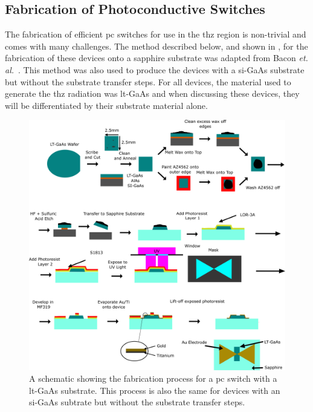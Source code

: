 \subsection{Fabrication of Photoconductive Switches}
The fabrication of efficient \acrshort{pc} switches for use in the \acrshort{thz} region is non\nobreakdash-trivial and comes with many challenges. The method described below, and shown in , for the fabrication of these devices onto a sapphire substrate was adapted from Bacon \textit{et. al.}~\cite{Bacon2016}. This method was also used to produce the devices with a \acrshort{si}\nobreakdash-GaAs substrate but without the substrate transfer steps. For all devices, the material used to generate the \acrshort{thz} radiation was \acrshort{lt}\nobreakdash-GaAs and when discussing these devices, they will be differentiated by their substrate material alone.

\begin{figure}[t]
    \centering
    \includegraphics[scale=0.49]{Figures/Misc/SysDev/Fabrication_V2.png}
    \captionsetup{font = footnotesize, justification = centering}
    \caption[A Schematic showing the Fabrication Process for a Photoconductive Switch with a LT-GaAs Substrate]{A schematic showing the fabrication process for a \acrshort{pc} switch with a \acrshort{lt}\nobreakdash-GaAs substrate. This process is also the same for devices with an \acrshort{si}\nobreakdash-GaAs subtrate but without the substrate transfer steps.}
    \label{fig:fabrication}
\end{figure}

